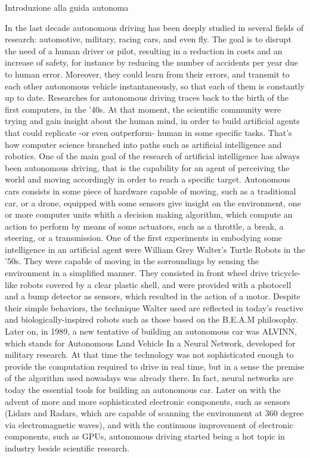 Introduzione alla guida autonoma

In the last decade autonomous driving has been deeply studied in several fields of research: automotive, military, racing cars, and even fly. The goal is to disrupt the need of a human driver or pilot, resulting in a reduction in costs and an increase of safety, for instance by reducing the number of accidents per year due to human error. Moreover, they could learn from their errors, and transmit to each other autonomous vehicle instantaneously, so that each of them is constantly up to date.
Researches for autonomous driving traces back to the birth of the first computers, in the '40s. At that moment, the scientific community were trying and gain insight about the human mind, in order to build artificial agents that could replicate -or even outperform- human in some specific tasks.
That's how computer science branched into paths such as artificial intelligence and robotics.
One of the main goal of the research of artificial intelligence has always been autonomous driving, that is the capability for an agent of perceiving the world and moving accordingly in order to reach a specific target.
Autonomous cars consists in some piece of hardware capable of moving, such as a traditional car, or a drone, equipped with some sensors give insight on the environment, one or more computer units whith a decision making algorithm, which compute an action to perform by means of some actuators, such as a throttle, a break, a steering, or a transmission.
One of the first experiments in embodying some intelligence in an artificial agent were William Grey Walter's Turtle Robots in the '50s. They were capable of moving in the sorroundings by sensing the environment in a simplified manner. They consisted in front wheel drive tricycle-like robots covered by a clear plastic shell, and were provided with a photocell and a bump detector as sensors, which resulted in the action of a motor. Despite their simple behaviors, the technique Walter used are reflected in today’s reactive and biologically-inspired robots such as those based on the B.E.A.M philosophy.
Later on, in 1989, a new tentative of building an autonomous car was ALVINN, which stands for Autonomous Land Vehicle In a Neural Network, developed for military research.
At that time the technology was not sophisticated enough to provide the computation required to drive in real time, but in a sense the premise of the algorithm used nowadays was already there. In fact, neural networks are today the essential tools for building an autonomous car.
Later on with the advent of more and more sophisticated electronic components, such as sensors (Lidars and Radars, which are capable of scanning the environment at 360 degree via electromagnetic waves), and with the continuous improvement of electronic components, such as GPUs, autonomous driving started being a hot topic in industry beside scientific research.

